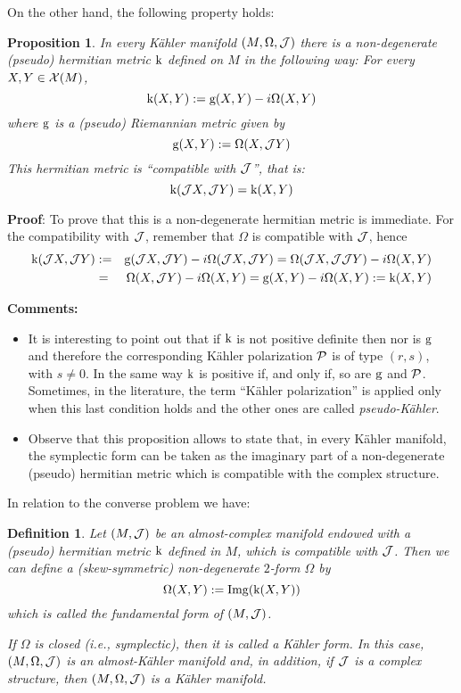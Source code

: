 \documentclass[12pt]{article}
\theoremstyle{plain}
\newtheorem{prop}{Proposition}
\newtheorem{definition}{Definition}
\def\beann{\begin{eqnarray*}}
\def\eeann{\end{eqnarray*}}
\def\qed{\ifvmode\removelastskip\fi
{\unskip\nobreak\hfil\penalty50\hbox{}\nobreak\hfil
\hbox{\vrule height1.2ex width1.2ex}\parfillskip=0pt
\finalhyphendemerits=0 \par\smallskip}}
\def\P{{\cal P}}
\begin{document}
On the other hand, the following property holds:

\begin{prop}
In every K\"ahler manifold $(M,\Omega ,{\cal J})$
there is a non-degenerate (pseudo) hermitian metric ${\rm k}$
defined on $M$ in the following way:
For every $X,Y \in {\cal X}(M)$,
$$
{\rm k} (X,Y) := {\rm g}(X,Y) - i\Omega (X,Y)
$$
where ${\rm g}$ is a (pseudo) Riemannian metric given by
$$
{\rm g}(X,Y) := \Omega (X,{\cal J}Y)
$$
This hermitian metric is ``compatible with ${\cal J}$'',
that is:
$$
{\rm k} ({\cal J}X,{\cal J}Y) = {\rm k} (X,Y)
$$
\end{prop}
{\bf Proof}: 
To prove that this is a non-degenerate hermitian metric is immediate.
For the compatibility with ${\cal J}$, remember that
$\Omega$ is compatible with ${\cal J}$, hence
\beann
{\rm k} ({\cal J}X,{\cal J}Y)&:=&
{\rm g}({\cal J}X,{\cal J}Y) - i\Omega ({\cal J}X,{\cal J}Y)
=\Omega ({\cal J}X,{\cal J}{\cal J}Y) - i\Omega (X,Y)
\\ &=&
\Omega (X,{\cal J}Y) - i\Omega (X,Y)
={\rm g}(X,Y) - i\Omega (X,Y) := {\rm k} (X,Y)
\eeann
\qed
{\bf Comments:}
\begin{itemize}
\item
It is interesting to point out that if ${\rm k}$ is not positive
definite
then nor is $\rm g$ and therefore the corresponding K\"ahler
polarization $\P$
is of type $(r,s)$, with $s\not=0$.
In the same way ${\rm k}$ is positive if, and only if, so are ${\rm g}$
and $\P$.
Sometimes, in the literature, the term ``K\"ahler polarization''
is applied only when this last condition holds and the
other ones are called {\it pseudo-K\"ahler}.
\item
Observe that this proposition allows to state that,
in every K\"ahler manifold,
the symplectic form can be taken as the imaginary part of a
non-degenerate (pseudo) hermitian metric
which is compatible with the complex structure.
\end{itemize}

In relation to the converse problem we have:

\begin{definition}
Let $(M,{\cal J})$ be an almost-complex manifold endowed
with a (pseudo) hermitian metric ${\rm k}$ defined in $M$,
which is compatible with ${\cal J}$.
Then we can define a (skew-symmetric) non-degenerate
$2$-form $\Omega$ by
$$
\Omega (X,Y) :={\rm Img} ({\rm k} (X,Y))
$$
which is called the
{\rm fundamental form} of $(M,{\cal J})$.

If $\Omega$ is closed (i.e., symplectic),
then it is called a {\rm K\"ahler form}.
In this case, $(M,\Omega ,{\cal J})$ is an almost-K\"ahler manifold
and, in addition, if ${\cal J}$ is a complex structure,
then $(M,\Omega ,{\cal J})$ is a K\"ahler manifold.
\end{definition}
\end{document}

